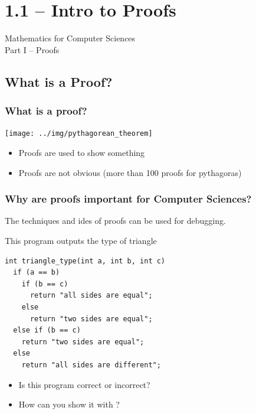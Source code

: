 \documentclass{beamer}
\begin{document}
\section{1.1 -- Intro to Proofs}

\begin{frame}
  \begin{center}
    Mathematics for Computer Sciences\\
    Part I -- Proofs
  \end{center}
\end{frame}

\subsection{What is a Proof?}

\begin{frame}
  \frametitle{What is a proof?}

  \begin{center}
    \texttt{[image: ../img/pythagorean\_theorem]}
  \end{center}
  \begin{itemize}
  \item Proofs are used to show  something
  \item Proofs are not obvious (more than 100 proofs for pythagoras)
  \end{itemize}
\end{frame}

\begin{frame}[fragile]
  \frametitle{Why are proofs important for Computer Sciences?}

  The techniques and ides of proofs can be used for \alert{debugging}.
  
  \begin{block}{This program outputs the type of triangle}
\begin{verbatim}
int triangle_type(int a, int b, int c)
  if (a == b)
    if (b == c) 
      return "all sides are equal";
    else
      return "two sides are equal";
  else if (b == c) 
    return "two sides are equal";
  else
    return "all sides are different"; 
\end{verbatim}
  \end{block}

  \begin{itemize}
  \item Is this program correct or incorrect?
  \item How can you show it with ?
  \end{itemize}
\end{frame}
\end{document}
